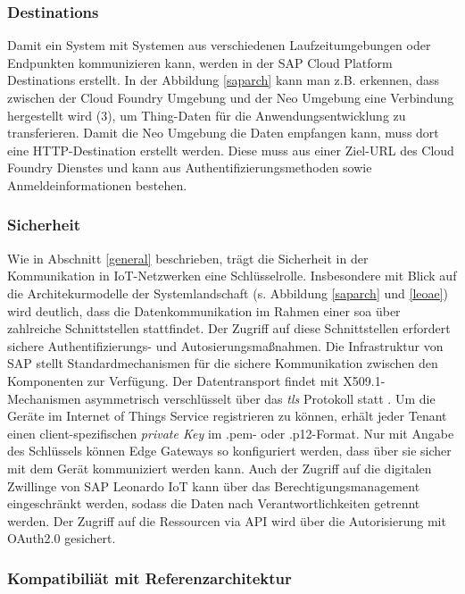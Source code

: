 \subsubsection{Destinations}

Damit ein System mit Systemen aus verschiedenen Laufzeitumgebungen oder Endpunkten kommunizieren kann, werden in der SAP Cloud Platform Destinations erstellt. In der Abbildung \ref{saparch} kann man z.B. erkennen, dass zwischen der Cloud Foundry Umgebung und der Neo Umgebung eine Verbindung hergestellt wird (3), um Thing-Daten für die Anwendungsentwicklung zu transferieren. Damit die Neo Umgebung die Daten empfangen kann, muss dort eine HTTP-Destination erstellt werden. Diese muss aus einer Ziel-URL des Cloud Foundry Dienstes und kann aus Authentifizierungsmethoden sowie Anmeldeinformationen bestehen.

\subsubsection{Sicherheit}

Wie in Abschnitt \ref{general} beschrieben, trägt die Sicherheit in der Kommunikation in IoT-Netzwerken eine Schlüsselrolle. Insbesondere mit Blick auf die Architekurmodelle der Systemlandschaft (s. Abbildung \ref{saparch} und \ref{leoae}) wird deutlich, dass die Datenkommunikation im Rahmen einer \ac{soa} über zahlreiche Schnittstellen stattfindet. Der Zugriff auf diese Schnittstellen erfordert sichere Authentifizierungs- und Autosierungsmaßnahmen. Die Infrastruktur von SAP stellt Standardmechanismen für die sichere Kommunikation zwischen den Komponenten zur Verfügung. Der Datentransport findet mit X509.1-Mechanismen asymmetrisch verschlüsselt über das \textit{\ac{tls}} Protokoll statt \citep{SAP2020a}. Um die Geräte im Internet of Things Service registrieren zu können, erhält jeder Tenant einen client-spezifischen \textit{private Key} im .pem- oder .p12-Format. Nur mit Angabe des Schlüssels können Edge Gateways so konfiguriert werden, dass über sie sicher mit dem Gerät kommuniziert werden kann. Auch der Zugriff auf die digitalen Zwillinge von SAP Leonardo IoT kann über das Berechtigungsmanagement eingeschränkt werden, sodass die Daten nach Verantwortlichkeiten getrennt werden. Der Zugriff auf die Ressourcen via API wird über die Autorisierung mit OAuth2.0 gesichert.

\subsubsection{Kompatibiliät mit Referenzarchitektur}

